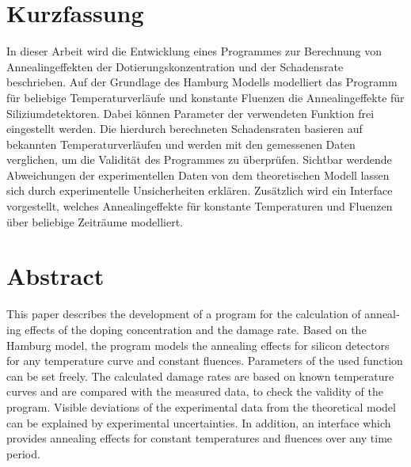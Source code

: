 \thispagestyle{plain}

\section*{Kurzfassung}
In dieser Arbeit wird die Entwicklung eines Programmes zur
Berechnung von Annealingeffekten der Dotierungskonzentration und der Schadensrate
beschrieben. Auf der Grundlage des Hamburg Modells modelliert das Programm für beliebige
Temperaturverläufe und konstante Fluenzen die Annealingeffekte für Siliziumdetektoren.
Dabei können Parameter der verwendeten Funktion frei eingestellt werden.
Die hierdurch berechneten Schadensraten basieren auf bekannten Temperaturverläufen und werden mit den gemessenen Daten verglichen,
um die Validität des Programmes zu überprüfen. Sichtbar werdende Abweichungen der
experimentellen Daten von dem theoretischen Modell lassen sich durch experimentelle Unsicherheiten erklären.
Zusätzlich wird ein Interface vorgestellt, welches Annealingeffekte für konstante Temperaturen und Fluenzen
über beliebige Zeiträume modelliert.

\section*{Abstract}
\begin{english}
  This paper describes the development of a program for the calculation of annealing effects of the doping concentration and the damage rate.
  Based on the Hamburg model, the program models the annealing effects for silicon detectors for any temperature curve and constant fluences.
  Parameters of the used function can be set freely.
  The calculated damage rates are based on known temperature curves and are compared with the measured data,
  to check the validity of the program.
   Visible deviations of the experimental data from the theoretical model can be explained by experimental uncertainties. In addition, an interface which provides annealing effects for constant temperatures and fluences over any time period.



\end{english}
